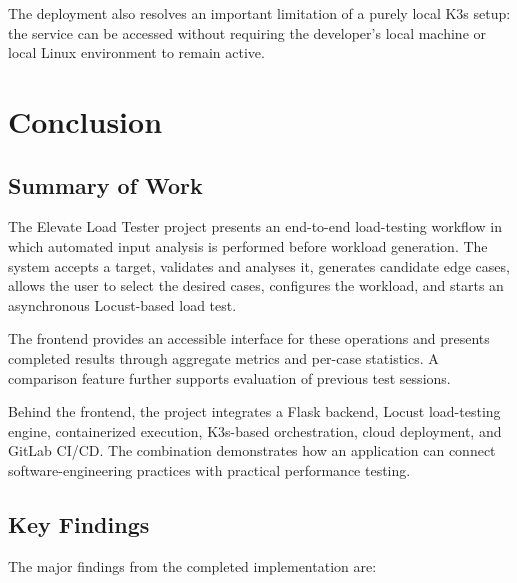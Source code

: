 \documentclass{tietreport}
\begin{document}
The deployment also resolves an important limitation of a purely local K3s setup: the service can be accessed without requiring the developer's local machine or local Linux environment to remain active.


\chapter{Conclusion}

\section{Summary of Work}

The Elevate Load Tester project presents an end-to-end load-testing workflow in which automated input analysis is performed before workload generation. The system accepts a target, validates and analyses it, generates candidate edge cases, allows the user to select the desired cases, configures the workload, and starts an asynchronous Locust-based load test.

The frontend provides an accessible interface for these operations and presents completed results through aggregate metrics and per-case statistics. A comparison feature further supports evaluation of previous test sessions.

Behind the frontend, the project integrates a Flask backend, Locust load-testing engine, containerized execution, K3s-based orchestration, cloud deployment, and GitLab CI/CD. The combination demonstrates how an application can connect software-engineering practices with practical performance testing.

\section{Key Findings}

The major findings from the completed implementation are:
\end{document}
